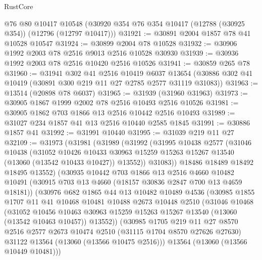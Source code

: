 \begin{lexlean}{RustCore}
\begin{coremodule}
    @76
    @80
    @10417
    @10548
    (@30920 @354 @76 @354 @10417 (@12788 (@30925 @354)) (@12796 (@12797 @10417)))
@31921 := @30891 @2004 @1857 @78 @41 @10528 @10547
@31924 := @30899 @2004 @78 @10528
@31932 := @30906 @1992 @2003 @78 @2516 @9013 @2516 @10528 @30930
@31939 := @30936 @1992 @2003 @78 @2516 @10420 @2516 @10526
@31941 := @30859 @265 @78
@31960 := @31941
    @302
    @41
    @2516
    @10419
    @6037
    @13654
    (@30886 @302 @41 @10419 (@30891 @300 @219 @11 @27 @2785 @2577 @31119 @31083))
@31963 := @13514 (@20898 @78 @6037)
@31965 := @31939 (@31960 @31963)
@31973 := @30905 @1867 @1999 @2002 @78 @2516 @10493 @2516 @10526
@31981 := @30905 @1862 @703 @1866 @13 @2516 @10442 @2516 @10493
@31989 := @31027 @234 @1857 @41 @13 @2516 @10440 @2585 @1845
@31991 := @30886 @1857 @41
@31992 := @31991 @10440
@31995 := @31039 @219 @11 @27
@32109 := @31973
    (@31981
      (@31989
        (@31992
          (@31995
            @10438
            @2577
            (@31046
              @10438
              (@31052
                @10426
                @10433
                @30963
                @15259
                @15263
                @15267
                @13540
                (@13060 (@13542 @10433 @10427))
                @13552))
            @31083))
        @18486
        @18489
        @18492
        @18495
        @13552)
      (@30935
        @10442
        @703
        @1866
        @13
        @2516
        @4660
        @10482
        @10491
        (@30915 @703 @13 @4660 (@18157 @30836 @2847 @700 @13 @4659 @18181))
        (@30976
          @682
          @1865
          @44
          @13
          @10482
          @10489
          @4536
          (@30985
            @1855
            @1707
            @11
            @41
            @10468
            @10481
            @10488
            @2673
            @10448
            @2510
            (@31046
              @10468
              (@31052
                @10456
                @10463
                @30963
                @15259
                @15263
                @15267
                @13540
                (@13060 (@13542 @10463 @10457))
                @13552))
            (@30985
              @1705
              @219
              @11
              @27
              @8570
              @2516
              @2577
              @2673
              @10474
              @2510
              (@31115 @1704 @8570 @27626 @27630)
              @31122
              @13564
              (@13060 (@13566 @10475 @2516)))
            @13564
            (@13060 (@13566 @10449 @10481)))

\end{coremodule}
\end{lexlean}
